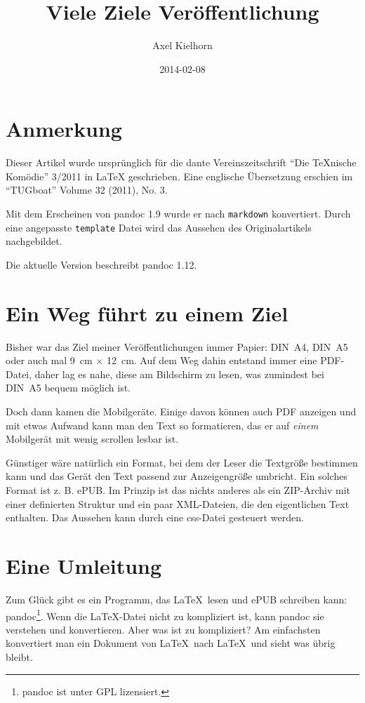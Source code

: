 \documentclass[11pt,ngerman,a4paper]{article}
\title{Viele Ziele Veröffentlichung}
\author{Axel Kielhorn}
\date{2014-02-08}
\begin{document}
\maketitle

\section{Anmerkung}\label{anmerkung}

Dieser Artikel wurde ursprünglich für die dante Vereinszeitschrift
\enquote{Die TeXnische Komödie} 3/2011 in LaTeX geschrieben. Eine
englische Übersetzung erschien im \enquote{TUGboat} Volume 32 (2011),
No. 3.

Mit dem Erscheinen von pandoc 1.9 wurde er nach \texttt{markdown}
konvertiert. Durch eine angepasste \texttt{template} Datei wird das
Aussehen des Originalartikels nachgebildet.

Die aktuelle Version beschreibt pandoc 1.12.

\section{Ein Weg führt zu einem
Ziel}\label{ein-weg-fuxfchrt-zu-einem-ziel}

Bisher war das Ziel meiner Veröffentlichungen immer Papier: DIN~A4,
DIN~A5 oder auch mal 9~cm $\times$ 12~cm. Auf dem Weg dahin entstand
immer eine PDF-Datei, daher lag es nahe, diese am Bildschirm zu lesen,
was zumindest bei DIN~A5 bequem möglich ist.

Doch dann kamen die Mobilgeräte. Einige davon können auch PDF anzeigen
und mit etwas Aufwand kann man den Text so formatieren, das er auf
\emph{einem} Mobilgerät mit wenig scrollen lesbar ist.

Günstiger wäre natürlich ein Format, bei dem der Leser die Textgröße
bestimmen kann und das Gerät den Text passend zur Anzeigengröße
umbricht. Ein solches Format ist z. B. ePUB. Im Prinzip ist das nichts
anderes als ein ZIP-Archiv mit einer definierten Struktur und ein paar
XML-Dateien, die den eigentlichen Text enthalten. Das Aussehen kann
durch eine css-Datei gesteuert werden.

\section{Eine Umleitung}\label{eine-umleitung}

Zum Glück gibt es ein Programm, das LaTeX~lesen und ePUB schreiben kann:
pandoc\autocite{pandoc}\footnote{pandoc ist unter GPL lizensiert.}. Wenn
die LaTeX-Datei nicht zu kompliziert ist, kann pandoc sie verstehen und
konvertieren. Aber was ist zu kompliziert? Am einfachsten konvertiert
man ein Dokument von LaTeX~nach LaTeX~und sieht was übrig bleibt.
\end{document}
